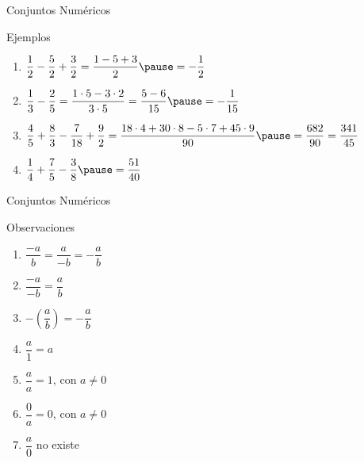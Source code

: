 \documentclass[aspectratio=169,handout,11pt]{beamer}
\begin{document}
	\begin{frame}{Conjuntos Numéricos}
		\begin{block}{Ejemplos}
			\begin{enumerate}
				\item $\dfrac{1}{2}-\dfrac{5}{2}+\dfrac{3}{2}
				=
				\dfrac{1-5+3}{2}
				\pause
				=
				-\dfrac{1}{2}$
				\pause
				
				\item $\dfrac{1}{3}-\dfrac{2}{5}
				=
				\dfrac{1\cdot5-3\cdot2}{3\cdot5}
				=
				\dfrac{5-6}{15}
				\pause
				=
				-\dfrac{1}{15}$
				\pause
				
				\item $\dfrac{4}{5}+\dfrac{8}{3}-\dfrac{7}{18}+\dfrac{9}{2}
				=
				\dfrac{18\cdot4+30\cdot8-5\cdot7+45\cdot9}{90}
				\pause
				=
				\dfrac{682}{90}
				=
				\dfrac{341}{45}$
				\pause
				
				\item $\dfrac{1}{4}+\dfrac{7}{5}-\dfrac{3}{8}
				\pause
				=
				\dfrac{51}{40}$
			\end{enumerate}
		\end{block}
	\end{frame}
	
	\begin{frame}{Conjuntos Numéricos}
		\begin{block}{Observaciones}
			\begin{enumerate}
				\item $\dfrac{-a}{b}=\dfrac{a}{-b}=-\dfrac{a}{b}$
				\pause
				\item $\dfrac{-a}{-b}=\dfrac{a}{b}$
				\pause
				\item $-\left(\dfrac{a}{b}\right)=-\dfrac{a}{b}$
				\pause
				\item $\dfrac{a}{1}=a$
				\pause
				\item $\dfrac{a}{a}=1$, con $a\neq0$
				\pause
				\item $\dfrac{0}{a}=0$, con $a\neq0$
				\pause
				\item $\dfrac{a}{0}$ no existe
			\end{enumerate}
		\end{block}
	\end{frame}
	
\end{document}
